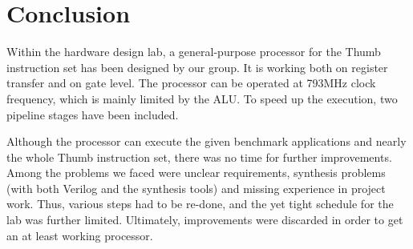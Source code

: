 \newpage
\section{Conclusion}
\label{sec:conclusion}
Within the hardware design lab, a general-purpose processor for the Thumb instruction set has been designed by our group. It is working both on register transfer and on gate level. The processor can be operated at 793MHz clock frequency, which is mainly limited by the ALU. To speed up the execution, two pipeline stages have been included. 

Although the processor can execute the given benchmark applications and nearly the whole Thumb instruction set, there was no time for further improvements. Among the problems we faced were unclear requirements, synthesis problems (with both Verilog and the synthesis tools) and missing experience in project work. Thus, various steps had to be re-done, and the yet tight schedule for the lab was further limited. Ultimately, improvements were discarded in order to get an at least working processor. 
